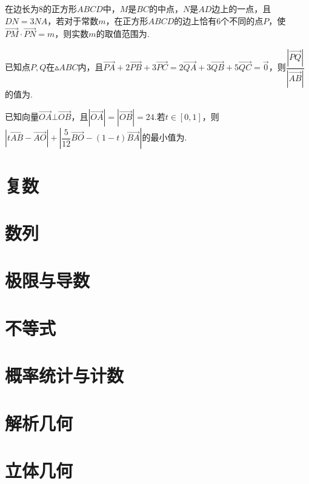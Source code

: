 \documentclass[cn,hazy,black,10pt,normal]{elegantnote}
\newcommand{\tk}{\uline{\hspace{4em}}}
\newcommand{\xl}[1]{\overrightarrow{#1}}
\begin{document}
\begin{problem} %
	在边长为$8$的正方形$ABCD$中，$M$是$BC$的中点，$N$是$AD$边上的一点，且$DN=3NA$，若对于常数$m$，在正方形$ABCD$的边上恰有$6$个不同的点$P$，使$\xl{PM} \cdot \xl{PN} = m$，则实数$m$的取值范围为\tk .
\end{problem}

\begin{problem} %
	已知点$P,Q$在$\vartriangle ABC$内，且$\xl{PA}+2\xl{PB}+3\xl{PC}=2\xl{QA}+3\xl{QB}+5\xl{QC}=\xl{0}$，则$\dfrac{|\xl{PQ}|}{|\xl{AB}|}$的值为\tk .
\end{problem}

\begin{problem} %
	已知向量$\xl{OA} \bot \xl{OB}$，且$|\xl{OA}|=|\xl{OB}|=24$.若$t \in [0,1]$，则$|t\xl{AB}-\xl{AO}| + |\dfrac{5}{12} \xl{BO} - (1-t)\xl{BA}|$的最小值为\tk .
\end{problem}



\chapter{复数}

\chapter{数列}

\chapter{极限与导数}

\chapter{不等式}

\chapter{概率统计与计数}

\chapter{解析几何}

\chapter{立体几何}
\end{document}
